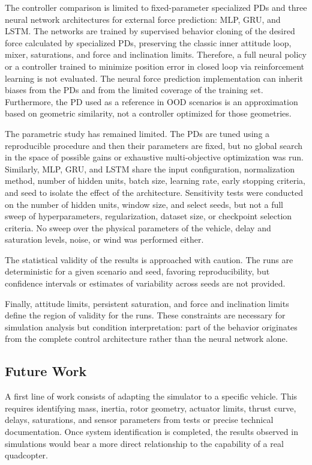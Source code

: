 The controller comparison is limited to fixed-parameter specialized PDs and three neural network architectures for external force prediction: MLP, GRU, and LSTM. The networks are trained by supervised behavior cloning of the desired force calculated by specialized PDs, preserving the classic inner attitude loop, mixer, saturations, and force and inclination limits. Therefore, a full neural policy or a controller trained to minimize position error in closed loop via reinforcement learning is not evaluated. The neural force prediction implementation can inherit biases from the PDs and from the limited coverage of the training set. Furthermore, the PD used as a reference in OOD scenarios is an approximation based on geometric similarity, not a controller optimized for those geometries.

The parametric study has remained limited. The PDs are tuned using a reproducible procedure and then their parameters are fixed, but no global search in the space of possible gains or exhaustive multi-objective optimization was run. Similarly, MLP, GRU, and LSTM share the input configuration, normalization method, number of hidden units, batch size, learning rate, early stopping criteria, and seed to isolate the effect of the architecture. Sensitivity tests were conducted on the number of hidden units, window size, and select seeds, but not a full sweep of hyperparameters, regularization, dataset size, or checkpoint selection criteria. No sweep over the physical parameters of the vehicle, delay and saturation levels, noise, or wind was performed either.

The statistical validity of the results is approached with caution. The runs are deterministic for a given scenario and seed, favoring reproducibility, but confidence intervals or estimates of variability across seeds are not provided.

Finally, attitude limits, persistent saturation, and force and inclination limits define the region of validity for the runs. These constraints are necessary for simulation analysis but condition interpretation: part of the behavior originates from the complete control architecture rather than the neural network alone.

\subsection{Future Work}

A first line of work consists of adapting the simulator to a specific vehicle. This requires identifying mass, inertia, rotor geometry, actuator limits, thrust curve, delays, saturations, and sensor parameters from tests or precise technical documentation. Once system identification is completed, the results observed in simulations would bear a more direct relationship to the capability of a real quadcopter.

